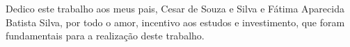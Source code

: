 \begin{dedicatoria}

    Dedico este trabalho aos meus pais, Cesar de Souza e Silva e Fátima Aparecida Batista Silva, por todo o amor, incentivo aos estudos e investimento, que foram fundamentais para a realização deste trabalho.

\end{dedicatoria}
